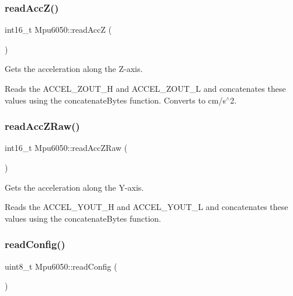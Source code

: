 \subsubsection{\texorpdfstring{read\+Acc\+Z()}{readAccZ()}}
{\footnotesize\ttfamily int16\+\_\+t Mpu6050\+::read\+AccZ (\begin{DoxyParamCaption}{ }\end{DoxyParamCaption})\hspace{0.3cm}{\ttfamily [virtual]}}



Gets the acceleration along the Z-\/axis. 

Reads the A\+C\+C\+E\+L\+\_\+\+Z\+O\+U\+T\+\_\+H and A\+C\+C\+E\+L\+\_\+\+Z\+O\+U\+T\+\_\+L and concatenates these values using the concatenate\+Bytes function. Converts to cm/s$^\wedge$2. \mbox{\label{classMpu6050_a6d8a3f3f3a8935fb9349bfd7a6e9d2e6}} 
\subsubsection{\texorpdfstring{read\+Acc\+Z\+Raw()}{readAccZRaw()}}
{\footnotesize\ttfamily int16\+\_\+t Mpu6050\+::read\+Acc\+Z\+Raw (\begin{DoxyParamCaption}{ }\end{DoxyParamCaption})\hspace{0.3cm}{\ttfamily [virtual]}}



Gets the acceleration along the Y-\/axis. 

Reads the A\+C\+C\+E\+L\+\_\+\+Y\+O\+U\+T\+\_\+H and A\+C\+C\+E\+L\+\_\+\+Y\+O\+U\+T\+\_\+L and concatenates these values using the concatenate\+Bytes function. \mbox{\label{classMpu6050_acae18af6f85523362243bb61cf865586}} 
\subsubsection{\texorpdfstring{read\+Config()}{readConfig()}}
{\footnotesize\ttfamily uint8\+\_\+t Mpu6050\+::read\+Config (\begin{DoxyParamCaption}{ }\end{DoxyParamCaption})\hspace{0.3cm}{\ttfamily [virtual]}}



